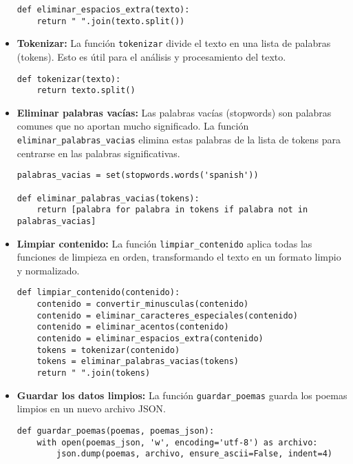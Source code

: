\begin{itemize}
    \begin{verbatim}
def eliminar_espacios_extra(texto):
    return " ".join(texto.split())
    \end{verbatim}

    \item \textbf{Tokenizar:} La función \texttt{tokenizar} divide el texto en una lista de palabras (tokens). Esto es útil para el análisis y procesamiento del texto.
    
    \begin{verbatim}
def tokenizar(texto):
    return texto.split()
    \end{verbatim}

    \item \textbf{Eliminar palabras vacías:} Las palabras vacías (stopwords) son palabras comunes que no aportan mucho significado. La función \texttt{eliminar\_palabras\_vacias} elimina estas palabras de la lista de tokens para centrarse en las palabras significativas.
    
    \begin{verbatim}
palabras_vacias = set(stopwords.words('spanish'))

def eliminar_palabras_vacias(tokens):
    return [palabra for palabra in tokens if palabra not in palabras_vacias]
    \end{verbatim}

    \item \textbf{Limpiar contenido:} La función \texttt{limpiar\_contenido} aplica todas las funciones de limpieza en orden, transformando el texto en un formato limpio y normalizado.
    
    \begin{verbatim}
def limpiar_contenido(contenido):
    contenido = convertir_minusculas(contenido)
    contenido = eliminar_caracteres_especiales(contenido)
    contenido = eliminar_acentos(contenido)
    contenido = eliminar_espacios_extra(contenido)
    tokens = tokenizar(contenido)
    tokens = eliminar_palabras_vacias(tokens)
    return " ".join(tokens)
    \end{verbatim}

    \item \textbf{Guardar los datos limpios:} La función \texttt{guardar\_poemas} guarda los poemas limpios en un nuevo archivo JSON.
    
    \begin{verbatim}
def guardar_poemas(poemas, poemas_json):
    with open(poemas_json, 'w', encoding='utf-8') as archivo:
        json.dump(poemas, archivo, ensure_ascii=False, indent=4)
    \end{verbatim}


\end{itemize}
